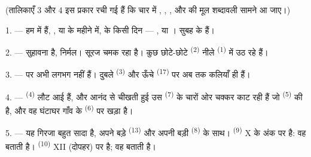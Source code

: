 %

\VUsaut{3.0mm}
\VUsaut{1.6mm}
\VUsaut{3.4mm}

(तालिकाएँ 3 और 4 इस प्रकार रची गई हैं कि चार  में
, , ,  और
 की मूल शब्दावली सामने आ जाए।)
\VUsaut{4.0mm}

\VUsaut{3.0mm}

\VUsaut{2.4mm}

\VUsaut{3.0mm}

1. --- हम  में हैं, ,  या
 के महीने में,  के किसी दिन --- ,
 या । सुबह के  हैं।

2. ---  सुहावना है,  निर्मल। सूरज चमक रहा है। कुछ छोटे-छोटे
\textsuperscript{(2)} नीले  \textsuperscript{(1)} में उठ रहे हैं।

3. ---  पर अभी  लगभग नहीं हैं। दुबले
 \textsuperscript{(3)} और ऊँचे 
\textsuperscript{(17)} पर अब तक कलियाँ ही हैं।

4. ---  \textsuperscript{(4)} लौट आई हैं, और आनंद से चीखती
हुई उस  \textsuperscript{(7)} के चारों ओर चक्कर काट रही हैं जो
 \textsuperscript{(5)} की है, और वह घंटाघर गाँव के
 \textsuperscript{(6)} पर खड़ा है।

\VUsaut{3.4mm}
\VUsaut{3.0mm}

5. --- यह गिरजा बहुत सादा है, अपने बड़े  \textsuperscript{(13)} और
अपनी बड़ी  \textsuperscript{(8)} के साथ। 
\textsuperscript{(9)} X के अंक पर है: वह  बताती है।
 \textsuperscript{(10)} XII (दोपहर) पर है; वह 
बताती है।

